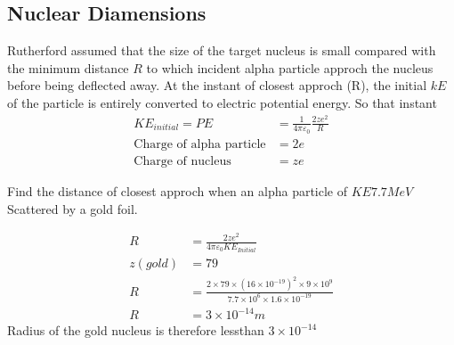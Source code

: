 \subsection{Nuclear Diamensions}
Rutherford assumed that the size of the target nucleus is small compared with the minimum distance $R$ to which incident alpha particle approch the nucleus before being deflected away. At the instant of closest approch (R), the initial $kE$ of the particle is entirely converted to electric potential energy. So that instant\\
\begin{align*}
KE_{initial}=PE&=\frac{1}{4\pi\varepsilon_0}\frac{2ze^2}{R}\\
\text{Charge of alpha particle}&=2e\\
\text{Charge of nucleus}&=ze
\end{align*}
\begin{center}
\end{center}
\begin{exercise}
	 Find the distance of closest approch when an alpha particle of $KE7.7 MeV$Scattered by a gold foil.
\end{exercise}
\begin{answer}
\begin{align*}
R&=\frac{2ze^2}{4\pi\varepsilon_0KE_{Initial}}\\
z(gold)&=79\\
R&=\frac{2\times79\times(16\times10^{-19})^2\times9\times10^9}{7.7\times10^6\times1.6\times10^{-19}}\\
R&=3\times10^{-14}m
\end{align*}
Radius of the gold nucleus is therefore lessthan $3\times10^{-14}$	
\end{answer}
